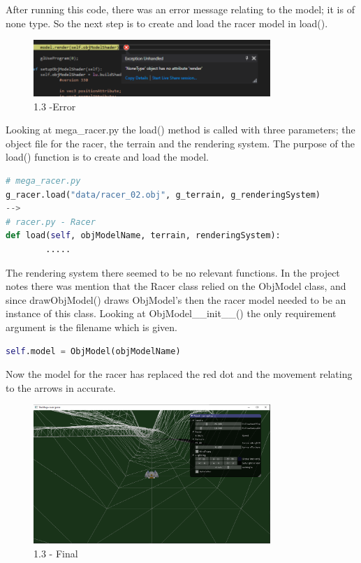 \documentclass[a4 paper, 12pt]{article}
\begin{document}
After running this code, there was an error message relating to the model; it is of none type. So the next step is to create and load the racer model in load(). 
    \begin{figure} [H]
        \centering
        \includegraphics[width=0.8\textwidth, frame]
            {./images/mega_racer/1.3_a.PNG}
        \caption{1.3 -Error}
    \end{figure}

Looking at mega\_racer.py the load() method is called with three parameters; the object file for the racer, the terrain and the rendering system. The purpose of the load() function is to create and load the model. 
    \begin{lstlisting}[language=python]
# mega_racer.py
g_racer.load("data/racer_02.obj", g_terrain, g_renderingSystem)
-->
# racer.py - Racer
def load(self, objModelName, terrain, renderingSystem):
        .....    
    \end{lstlisting}

The rendering system there seemed to be no relevant functions. In the project notes there was mention that the Racer class relied on the ObjModel class, and since drawObjModel() draws ObjModel's then the racer model needed to be an instance of this class. Looking at ObjModel\_\_init\_\_() the only requirement argument is the filename which is given.
    \begin{lstlisting}[language=python]
    self.model = ObjModel(objModelName)
    \end{lstlisting}   

Now the model for the racer has replaced the red dot and the movement relating to the arrows in accurate.
\begin{figure} [H]
    \centering
    \includegraphics[width=0.8\textwidth, frame]
        {./images/mega_racer/1.3_b.PNG}
    \caption{1.3 - Final}
\end{figure}
\end{document}
